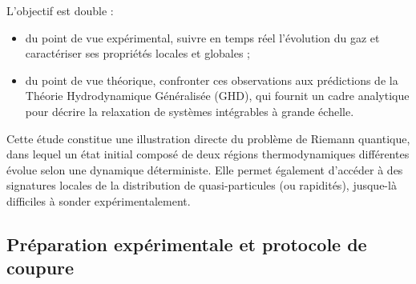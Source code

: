 L’objectif est double :

\begin{itemize}[label = $\bullet$]
	\item du point de vue expérimental, suivre en temps réel l’évolution du gaz et caractériser ses propriétés locales et globales ;
	\item du point de vue théorique, confronter ces observations aux prédictions de la Théorie Hydrodynamique Généralisée (GHD), qui fournit un cadre analytique pour décrire la relaxation de systèmes intégrables à grande échelle.
\end{itemize}

Cette étude constitue une illustration directe du problème de Riemann quantique, dans lequel un état initial composé de deux régions thermodynamiques différentes évolue selon une dynamique déterministe. Elle permet également d’accéder à des signatures locales de la distribution de quasi-particules (ou rapidités), jusque-là difficiles à sonder expérimentalement.

\medskip



\subsection{Préparation expérimentale et protocole de coupure}
\label{chap6:sec.propcol}



